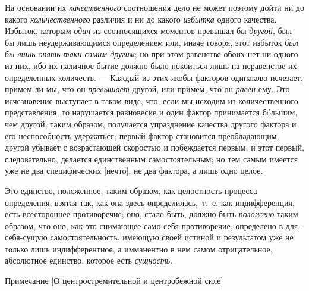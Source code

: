 На основании их {\em качественного} соотношения дело не
может поэтому дойти ни до какого {\em количественного}
различия и ни до какого {\em избытка} одного качества.
Избыток, которым {\em один} из соотносящихся моментов
превышал бы {\em другой}, был бы лишь неудерживающимся
определением или, иначе говоря, этот избыток {\em был
бы лишь опять-таки самим другим}; но при этом равенстве обоих нет ни одного
из них, ибо их наличное бытие должно было покоиться лишь на неравенстве их
определенных количеств. — Каждый из этих якобы факторов одинаково исчезает,
примем ли мы, что он {\em превышает} другой, или
примем, что он {\em равен} ему. Это исчезновение
выступает в таком виде, что, если мы исходим из количественного
представления, то нарушается равновесие и один фактор принимается бóльшим,
чем другой; таким образом, получается упразднение качества другого фактора
и его неспособность удержаться; первый фактор становится преобладающим,
другой убывает с возрастающей скоростью и побеждается первым, и этот
первый, следовательно, делается единственным самостоятельным; но тем самым
имеется уже не два специфических [нечто], не два фактора, а лишь одно
целое.

Это единство, положенное, таким образом, как целостность процесса
определения, взятая так, как она здесь определилась,~т.~е. как
индифференция, есть всестороннее противоречие; оно, стало быть, должно быть
{\em положено} таким образом, что оно, как это
снимающее само себя противоречие, определено в для-себя-сущую
самостоятельность, имеющую своей истиной и результатом уже не только лишь
индифферентное, а имманентно в нем самом отрицательное, абсолютное единство,
которое есть {\em сущность}.

{\centering
Примечание
[О центростремительной и центробежной силе]
\par}

